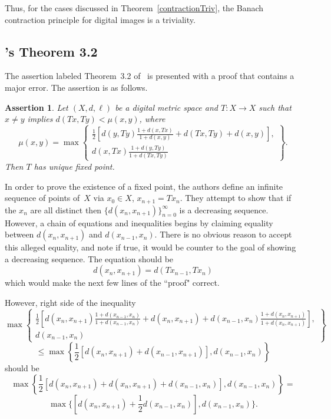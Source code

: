 \documentclass{article}
\newtheorem{assert}[thm]{Assertion}
\numberwithin{thm}{section}
\begin{document}
Thus, for the cases discussed
in Theorem~\ref{contractionTriv}, the Banach contraction
principle for digital images
is a triviality.

\subsection{\cite{GuptaEtal}'s Theorem 3.2}
\label{secGupta3.2}
The assertion labeled Theorem~3.2 of~\cite{GuptaEtal} is
presented with a proof that
contains a major error. The
assertion is as follows.

\begin{assert}
{\rm \cite{GuptaEtal}}
\label{Gupta3.2}
    Let $(X,d,\ell)$ be a
    digital metric space and
    $T: X \to X$ such that
    $x \neq y$ implies
    $d(Tx,Ty) < \mu(x,y)$,
    where
    \[ \mu(x,y) = \max
    \left \{
    \begin{array}{c}
      \frac{1}{2} \left [
      d(y,Ty) \frac{1+d(x,Tx)}{1+d(x,y)} +
      d(Tx,Ty) + d(x,y) \right ] , \\
    d(x,Tx) \frac{1 + d(y,Ty)}{1+d(Tx,Ty)}
    \end{array}
    \right \} .
    \]
    Then $T$ has unique fixed point.
\end{assert}

In order to prove the
existence of a fixed point,
the authors define an infinite sequence of points
of~$X$ via $x_0 \in X$, 
$x_{n+1}=Tx_n$. They
attempt to show that if
the $x_n$ are all distinct 
then $\{d(x_n,x_{n+1})\}_{n=0}^{\infty}$ is a decreasing sequence. However, a chain
of equations and inequalities begins by claiming equality between
$d(x_n,x_{n+1})$ and
$d(x_{n-1},x_n)$. 
There is no obvious reason to
accept this alleged
equality, and note if true,
it would be counter to the goal of showing a decreasing sequence. The equation
should be
\[ d(x_n,x_{n+1})=
d(Tx_{n-1},Tx_n)\]
which would make the
next few lines of the
``proof" correct.

However, right side 
of the inequality
\[ \max \left \{
\begin{array}{c}
\frac{1}{2} \left [
d(x_n,x_{n+1})
\frac{1+d(x_{n-1},x_n)}{1+d(x_{n-1},x_n)} + d(x_n,x_{n+1}) +
d(x_{n-1},x_n)
\frac{1+d(x_n,x_{n+1})}{1+d(x_n,x_{n+1})}
\right ], \\ d(x_{n-1},x_n) \end{array}
\right \}
\]
\[ \le \max \left \{
\frac{1}{2}[d(x_n,x_{n+1}) +
 d(x_{n-1},x_{n+1})],
 d(x_{n-1},x_n)
\right \}
\]
should be
\[ \max \left \{
\frac{1}{2} [ d(x_n,x_{n+1}) + 
d(x_n,x_{n+1}) +
d(x_{n-1},x_n)],
d(x_{n-1},x_n)
\right \} =
\]
\[ \max \{ [
   d(x_n,x_{n+1}) +
   \frac{1}{2}
   d(x_{n-1},x_n)],
d(x_{n-1},x_n) \}.
\]
\end{document}
